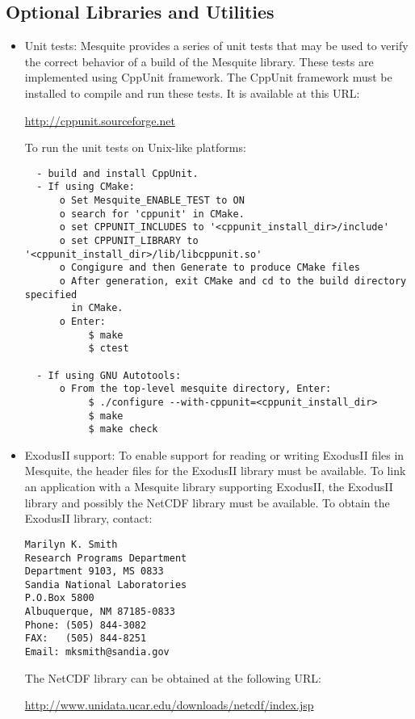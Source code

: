 \subsection{Optional Libraries and Utilities}
\label{sec:depends}
\begin{itemize}
\item Unit tests:  Mesquite provides a series of unit tests that may be used
to verify the correct behavior of a build of the Mesquite library.  These tests
are implemented using CppUnit framework.  The CppUnit framework must be installed
to compile and run these tests.  It is available at this URL:
\begin{center}
\url{http://cppunit.sourceforge.net}
\end{center}

To run the unit tests on Unix-like platforms:
\begin{verbatim}
  - build and install CppUnit.
  - If using CMake:
      o Set Mesquite_ENABLE_TEST to ON
      o search for 'cppunit' in CMake.
      o set CPPUNIT_INCLUDES to '<cppunit_install_dir>/include'  
      o set CPPUNIT_LIBRARY to '<cppunit_install_dir>/lib/libcppunit.so' 
      o Congigure and then Generate to produce CMake files
      o After generation, exit CMake and cd to the build directory specified
        in CMake.  
      o Enter:
           $ make
           $ ctest

  - If using GNU Autotools:
      o From the top-level mesquite directory, Enter:
           $ ./configure --with-cppunit=<cppunit_install_dir>
           $ make
           $ make check

\end{verbatim}
\item ExodusII support:  To enable support for reading or writing ExodusII files in Mesquite, the header files for the ExodusII library must be available.  To link an application with a Mesquite library supporting ExodusII, the ExodusII library and possibly the NetCDF library must be available.  To obtain the ExodusII library, contact:
\begin{verbatim}
Marilyn K. Smith
Research Programs Department
Department 9103, MS 0833
Sandia National Laboratories
P.O.Box 5800
Albuquerque, NM 87185-0833
Phone: (505) 844-3082
FAX:   (505) 844-8251
Email: mksmith@sandia.gov
\end{verbatim}
The NetCDF library can be obtained at the following URL:
\begin{center}
\begin{small}\url{http://www.unidata.ucar.edu/downloads/netcdf/index.jsp}\end{small}
\end{center}
\end{itemize}

